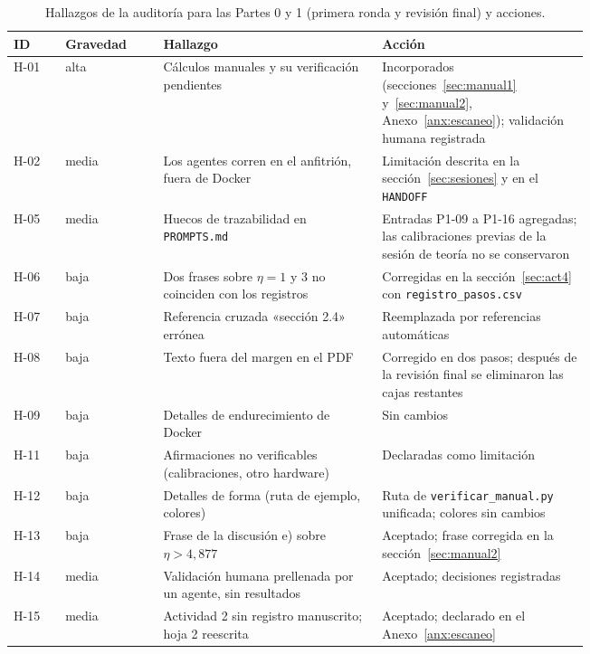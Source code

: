 \documentclass[10pt]{article}
\begin{document}
\begin{table}[H]
  \centering\small
  \caption{Hallazgos de la auditoría para las Partes 0 y 1 (primera ronda y revisión final) y acciones.}
  \label{tab:auditoria}
  \begin{tabular}{@{}llp{0.38\linewidth}p{0.36\linewidth}@{}}
    \toprule
    ID & Gravedad & Hallazgo & Acción \\
    \midrule
    H-01 & alta  & Cálculos manuales y su verificación pendientes & Incorporados (secciones~\ref{sec:manual1}
                   y~\ref{sec:manual2}, Anexo~\ref{anx:escaneo}); validación humana registrada \\
    H-02 & media & Los agentes corren en el anfitrión, fuera de Docker & Limitación descrita en la
                   sección~\ref{sec:sesiones} y en el \texttt{HANDOFF} \\
    H-05 & media & Huecos de trazabilidad en \texttt{PROMPTS.md} & Entradas P1-09 a P1-16 agregadas;
                   las calibraciones previas de la sesión de teoría no se conservaron \\
    H-06 & baja  & Dos frases sobre $\eta = 1$ y $3$ no coinciden con los registros & Corregidas en la
                   sección~\ref{sec:act4} con \texttt{registro\_pasos.csv} \\
    H-07 & baja  & Referencia cruzada «sección 2.4» errónea & Reemplazada por referencias automáticas \\
    H-08 & baja  & Texto fuera del margen en el PDF & Corregido en dos pasos; después de la
                   revisión final se eliminaron las cajas restantes \\
    H-09 & baja  & Detalles de endurecimiento de Docker & Sin cambios \\
    H-11 & baja  & Afirmaciones no verificables (calibraciones, otro hardware) & Declaradas como
                   limitación \\
    H-12 & baja  & Detalles de forma (ruta de ejemplo, colores) & Ruta de \texttt{verificar\_manual.py}
                   unificada; colores sin cambios \\
    \midrule
    H-13 & baja  & Frase de la discusión e) sobre $\eta > 4{,}877$ & Aceptado; frase corregida en la
                   sección~\ref{sec:manual2} \\
    H-14 & media & Validación humana prellenada por un agente, sin resultados & Aceptado; decisiones
                   registradas \\
    H-15 & media & Actividad 2 sin registro manuscrito; hoja 2 reescrita & Aceptado; declarado en el
                   Anexo~\ref{anx:escaneo} \\
    \bottomrule
  \end{tabular}
\end{table}
\end{document}
